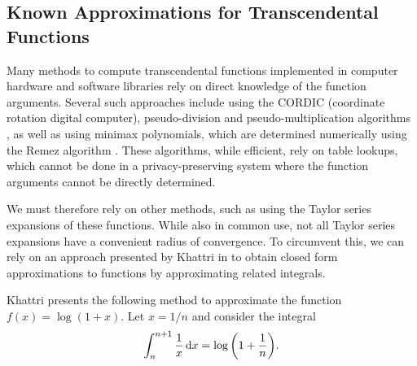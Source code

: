 \subsection{Known Approximations for Transcendental Functions}
Many methods to compute transcendental functions implemented in computer hardware and software libraries rely on direct knowledge of the function arguments. Several such approaches include using the CORDIC (coordinate rotation digital computer), pseudo-division and pseudo-multiplication algorithms \cite{walther_cordic_2000}, as well as using minimax polynomials, which are determined numerically using the Remez algorithm \cite{harrison_computation_1999}. These algorithms, while efficient, rely on table lookups, which cannot be done in a privacy-preserving system where the function arguments cannot be directly determined.

We must therefore rely on other methods, such as using the Taylor series expansions of these functions. While also in common use, not all Taylor series expansions have a convenient radius of convergence. To circumvent this, we can rely on an approach presented by Khattri in \cite{khattri_new_2009} to obtain closed form approximations to functions by approximating related integrals.

Khattri presents the following method to approximate the function $f(x)=\log(1+x)$.
Let $x = 1/n$ and consider the integral
\begin{align}
	\label{eq:log_integral}
	\int_{n}^{n+1}{\frac{1}{x}\mathop{}\!\mathrm{d} x}=\log{\left(1+\frac{1}{n}\right)}.
\end{align}

